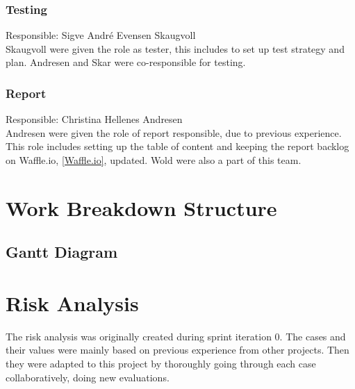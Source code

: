 \subsubsection{Testing}
Responsible: Sigve André Evensen Skaugvoll\\
Skaugvoll were given the role as tester, this includes to set up test strategy and plan. Andresen and Skar were co-responsible for testing. 

\subsubsection{Report}
Responsible: Christina Hellenes Andresen\\
Andresen were given the role of report responsible, due to previous experience. This role includes setting up the table of content and keeping the report backlog on Waffle.io, \ref{Waffle.io}, updated. Wold were also a part of this team.


\section{Work Breakdown Structure}


\subsection{Gantt Diagram} 

\section{Risk Analysis} \label{riskAnalysis}
The risk analysis was originally created during sprint iteration 0. The cases and their values were mainly based on previous experience from other projects. Then they were adapted to this project by thoroughly going through each case collaboratively, doing new evaluations.

